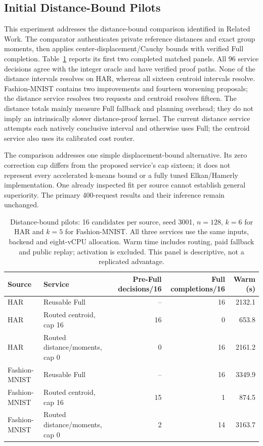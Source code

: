 \documentclass[5p,times,twocolumn]{elsarticle}
\begin{document}
\subsection{Initial Distance-Bound Pilots}

This experiment addresses the distance-bound comparison identified in
Related Work. The comparator authenticates private reference distances and
exact group moments, then applies center-displacement/Cauchy bounds with
verified Full completion. Table~\ref{tab:revision-distance} reports its
first two completed matched panels. All 96 service decisions agree with the
integer oracle and have verified proof paths. None of the distance
intervals resolves on HAR, whereas all sixteen centroid intervals resolve.
Fashion-MNIST contains two improvements and fourteen worsening proposals;
the distance service resolves two requests and centroid resolves fifteen.
The distance totals mainly measure Full fallback and planning overhead;
they do not imply an intrinsically slower distance-proof kernel. The
current distance service attempts each natively conclusive interval and
otherwise uses Full; the centroid service also uses its calibrated cost router.

The comparison addresses one simple displacement-bound alternative. Its
zero correction cap differs from the proposed service's cap sixteen;
it does not represent every accelerated k-means bound or a fully tuned
Elkan/Hamerly implementation. One already inspected fit per source cannot
establish general superiority. The primary 400-request results and their
inference remain unchanged.


\begin{table}[H]
\centering\small
\caption{Distance-bound pilots: 16 candidates per source, seed 3001,
$n=128$, $k=6$ for HAR and $k=5$ for Fashion-MNIST. All three services use the same inputs, backend and eight-vCPU
allocation. Warm time includes routing, paid fallback and public replay;
activation is excluded. This panel is descriptive, not a replicated advantage.}
\label{tab:revision-distance}
\begin{tabular}{@{}llrrr@{}}\toprule
Source & Service & Pre-Full decisions/16 & Full completions/16 & Warm (s)\\\midrule
HAR & Reusable Full & -- & 16 & 2132.1\\
HAR & Routed centroid, cap 16 & 16 & 0 & 653.8\\
HAR & Routed distance/moments, cap 0 & 0 & 16 & 2161.2\\
Fashion-MNIST & Reusable Full & -- & 16 & 3349.9\\
Fashion-MNIST & Routed centroid, cap 16 & 15 & 1 & 874.5\\
Fashion-MNIST & Routed distance/moments, cap 0 & 2 & 14 & 3163.7\\\bottomrule
\end{tabular}
\end{table}
\end{document}
